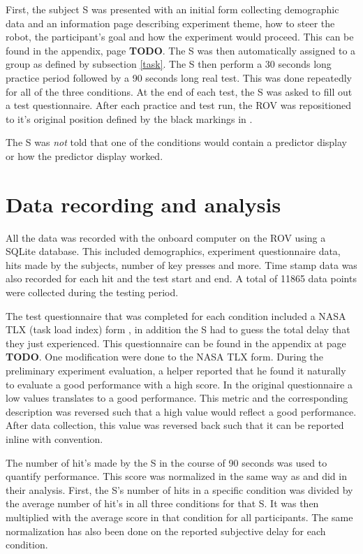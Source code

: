 First, the subject S was presented with an initial form collecting demographic data and an information page describing experiment theme, how to steer the robot, the participant's goal and how the experiment would proceed. This can be found in the appendix, page \textbf{TODO}. The S was then automatically assigned to a group as defined by subsection \ref{task}. The S then perform a 30 seconds long practice period followed by a 90 seconds long real test. This was done repeatedly for all of the three conditions. At the end of each test, the S was asked to fill out a test questionnaire.  After each practice and test run, the ROV was repositioned to it's original position defined by the black markings in .

The S was \emph{not} told that one of the conditions would contain a predictor display or how the predictor display worked.

\section{Data recording and analysis}

All the data was recorded with the onboard computer on the ROV using a SQLite database. This included demographics, experiment questionnaire data, hits made by the subjects, number of key presses and more. Time stamp data was also recorded for each hit and the test start and end. A total of 11865 data points were collected during the testing period.

The test questionnaire that was completed for each condition included a NASA TLX (task load index) form \citep{Hart1988}, in addition the S had to guess the total delay that they just experienced. This questionnaire can be found in the appendix at page \textbf{TODO}. One modification were done to the NASA TLX form. During the preliminary experiment evaluation, a helper reported that he found it naturally to evaluate a good performance with a high score. In the original questionnaire a low values translates to a good performance. This metric and the corresponding description was reversed such that a high value would reflect a good performance. After data collection, this value was reversed back such that it can be reported inline with convention.

The number of hit's made by the S in the course of 90 seconds was used to quantify performance. This score was normalized in the same way as \citep{Rachmielowski2010} and \citep{Lovi2010} did in their analysis. First, the S's number of hits in a specific condition was divided by the average number of hit's in all three conditions for that S. It was then multiplied with the average score in that condition for all participants. The same normalization has also been done on the reported subjective delay for each condition.

